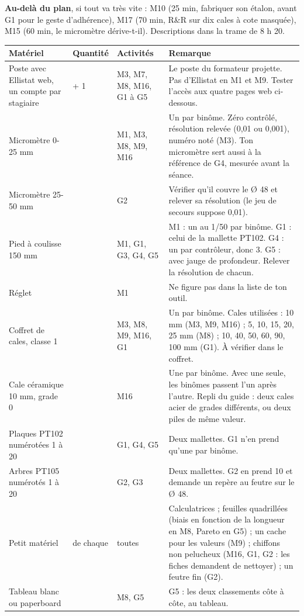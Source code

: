 \documentclass[10pt,a4paper]{article}
\begin{document}
\noindent\parbox{\linewidth}{\textbf{Au-delà du plan}, si tout va très vite : M10 (25 min, fabriquer son étalon, avant G1 pour le geste d'adhérence), M17 (70 min, R\&R sur dix cales à cote masquée), M15 (60 min, le micromètre dérive-t-il). Descriptions dans la trame de 8 h 20.}

\renewcommand{\arraystretch}{1.18}\small
\begin{tabularx}{\linewidth}{|>{\raggedright\arraybackslash}p{44mm}|>{\centering\arraybackslash}p{13mm}|>{\raggedright\arraybackslash}p{22mm}|>{\raggedright\arraybackslash}X|}\hline
\rowcolor{uimm}\color{white}\textbf{Matériel} & \color{white}\textbf{Quantité} & \color{white}\textbf{Activités} & \color{white}\textbf{Remarque}\\\hline
Poste avec Ellistat web, un compte par stagiaire & 4 + 1 & M3, M7, M8, M16, G1 à G5 & Le poste du formateur projette. Pas d'Ellistat en M1 et M9. Tester l'accès aux quatre pages web ci-dessous.\\ \hline
Micromètre 0-25 mm & 2 & M1, M3, M8, M9, M16 & Un par binôme. Zéro contrôlé, résolution relevée (0,01 ou 0,001), numéro noté (M3). Ton micromètre sert aussi à la référence de G4, mesurée avant la séance.\\ \hline
Micromètre 25-50 mm & 1 & G2 & Vérifier qu'il couvre le Ø 48 et relever sa résolution (le jeu de secours suppose 0,01).\\ \hline
Pied à coulisse 150 mm & 4 & M1, G1, G3, G4, G5 & M1 : un au 1/50 par binôme. G1 : celui de la mallette PT102. G4 : un par contrôleur, donc 3. G5 : avec jauge de profondeur. Relever la résolution de chacun.\\ \hline
Réglet & 2 & M1 & Ne figure pas dans la liste de ton outil.\\ \hline
Coffret de cales, classe 1 & 2 & M3, M8, M9, M16, G1 & Un par binôme. Cales utilisées : 10 mm (M3, M9, M16) ; 5, 10, 15, 20, 25 mm (M8) ; 10, 40, 50, 60, 90, 100 mm (G1). À vérifier dans le coffret.\\ \hline
Cale céramique 10 mm, grade 0 & 2 & M16 & Une par binôme. Avec une seule, les binômes passent l'un après l'autre. Repli du guide : deux cales acier de grades différents, ou deux piles de même valeur.\\ \hline
Plaques PT102 numérotées 1 à 20 & 20 & G1, G4, G5 & Deux mallettes. G1 n'en prend qu'une par binôme.\\ \hline
Arbres PT105 numérotés 1 à 20 & 20 & G2, G3 & Deux mallettes. G2 en prend 10 et demande un repère au feutre sur le Ø 48.\\ \hline
Petit matériel & 4 de chaque & toutes & Calculatrices ; feuilles quadrillées (biais en fonction de la longueur en M8, Pareto en G5) ; un cache pour les valeurs (M9) ; chiffons non pelucheux (M16, G1, G2 : les fiches demandent de nettoyer) ; un feutre fin (G2).\\ \hline
Tableau blanc ou paperboard & 1 & M8, G5 & G5 : les deux classements côte à côte, au tableau.\\ \hline
\end{tabularx}
\end{document}
